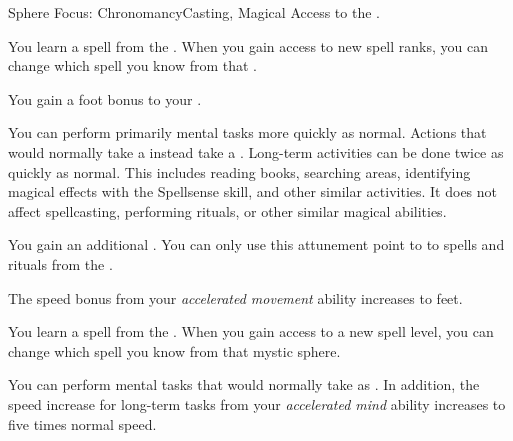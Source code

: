     \begin{feat}{Sphere Focus: Chronomancy}{Casting, Magical}
        \featpre Access to the  .

         You learn a spell from the  .
        When you gain access to new spell ranks, you can change which spell you know from that .

         You gain a  foot bonus to your .

         You can perform primarily mental tasks more quickly as normal.
        Actions that would normally take a  instead take a .
        Long-term activities can be done twice as quickly as normal.
        This includes reading books, searching areas, identifying magical effects with the Spellsense skill, and other similar activities.
        It does not affect spellcasting, performing rituals, or other similar magical abilities.

         You gain an additional .
        You can only use this attunement point to  to spells and rituals from the  .

         The speed bonus from your \textit{accelerated movement} ability increases to  feet.

         You learn a spell from the  .
        When you gain access to a new spell level, you can change which spell you know from that mystic sphere.

         You can perform  mental tasks that would normally take  as .
        In addition, the speed increase for long-term tasks from your \textit{accelerated mind} ability increases to five times normal speed.
    \end{feat}

